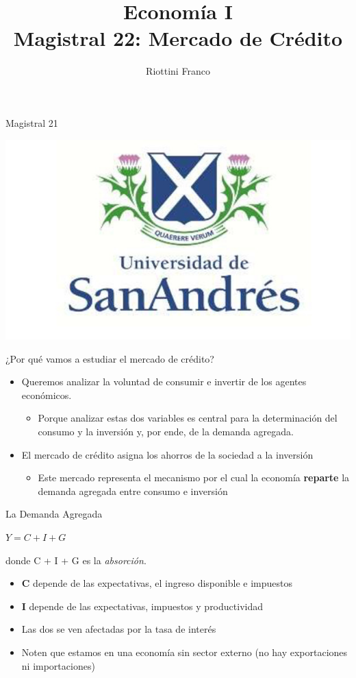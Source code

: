 \documentclass{beamer}
\title[Economía I]{Economía I \vspace{4mm}
\\ Magistral 22: Mercado de Crédito}
\date{}
\author[Riottini]{Riottini Franco}
\institute[]{Universidad de San Andrés}
\begin{document}
\begin{frame}
\titlepage
\centering
Magistral 21

\includegraphics[scale=0.2]{../Figures/logoUDESA.jpg} 
\end{frame}

\begin{frame}{¿Por qué vamos a estudiar el mercado de crédito?}
    \begin{itemize}
        \item Queremos analizar la voluntad de consumir e invertir de los agentes económicos.
        \begin{itemize}
            \item Porque analizar estas dos variables es central para la determinación del consumo y la inversión y, por ende, de la demanda agregada. 
        \end{itemize}
        \item El mercado de crédito asigna los ahorros de la sociedad a la inversión
        \begin{itemize}
            \item Este mercado representa el mecanismo por el cual la economía \textbf{reparte} la demanda agregada entre consumo e inversión
        \end{itemize}
    \end{itemize}
\end{frame}

\begin{frame}{La Demanda Agregada}
    \begin{center}
        \(Y = C + I + G\) 
    \end{center}
    donde C + I + G es la \textit{absorción}.
    \begin{itemize}
            \item \textbf{C} depende de las expectativas, el ingreso disponible e impuestos
            \item \textbf{I} depende de las expectativas, impuestos y productividad
            \item Las dos se ven afectadas por la tasa de interés
            \item Noten que estamos en una economía sin sector externo (no hay exportaciones ni importaciones)
    \end{itemize}
\end{frame}
\end{document}
